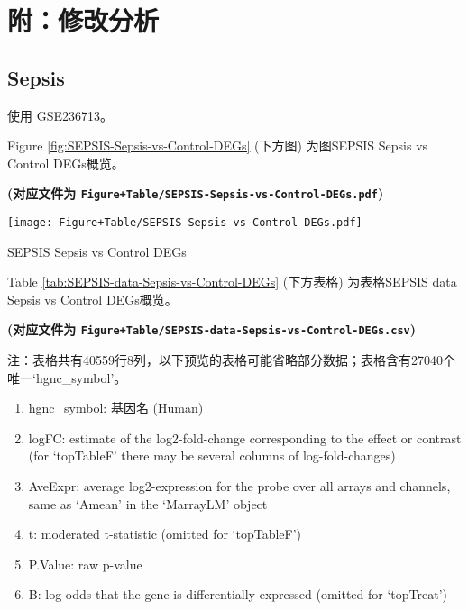 \documentclass[
]{article}
\providecommand{\tightlist}{%
  \setlength{\itemsep}{0pt}\setlength{\parskip}{0pt}}
\begin{document}
\hypertarget{revise}{%
\section{附：修改分析}\label{revise}}

\hypertarget{sepsis}{%
\subsection{Sepsis}\label{sepsis}}

使用 GSE236713。

Figure \ref{fig:SEPSIS-Sepsis-vs-Control-DEGs} (下方图) 为图SEPSIS Sepsis vs Control DEGs概览。

\textbf{(对应文件为 \texttt{Figure+Table/SEPSIS-Sepsis-vs-Control-DEGs.pdf})}

\def\@captype{figure}
\begin{center}
\texttt{[image: Figure+Table/SEPSIS-Sepsis-vs-Control-DEGs.pdf]}
\caption{SEPSIS Sepsis vs Control DEGs}\label{fig:SEPSIS-Sepsis-vs-Control-DEGs}
\end{center}

Table \ref{tab:SEPSIS-data-Sepsis-vs-Control-DEGs} (下方表格) 为表格SEPSIS data Sepsis vs Control DEGs概览。

\textbf{(对应文件为 \texttt{Figure+Table/SEPSIS-data-Sepsis-vs-Control-DEGs.csv})}

\begin{center}\begin{tcolorbox}[colback=gray!10, colframe=gray!50, width=0.9\linewidth, arc=1mm, boxrule=0.5pt]注：表格共有40559行8列，以下预览的表格可能省略部分数据；表格含有27040个唯一`hgnc\_symbol'。
\end{tcolorbox}
\end{center}
\begin{center}\begin{tcolorbox}[colback=gray!10, colframe=gray!50, width=0.9\linewidth, arc=1mm, boxrule=0.5pt]\begin{enumerate}\tightlist
\item hgnc\_symbol:  基因名 (Human)
\item logFC:  estimate of the log2-fold-change corresponding to the effect or contrast (for ‘topTableF’ there may be several columns of log-fold-changes)
\item AveExpr:  average log2-expression for the probe over all arrays and channels, same as ‘Amean’ in the ‘MarrayLM’ object
\item t:  moderated t-statistic (omitted for ‘topTableF’)
\item P.Value:  raw p-value
\item B:  log-odds that the gene is differentially expressed (omitted for ‘topTreat’)
\end{enumerate}\end{tcolorbox}
\end{center}
\end{document}
